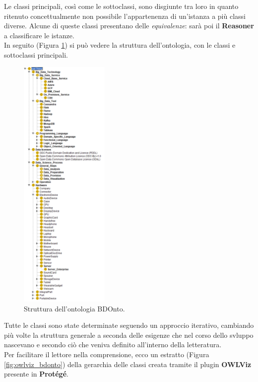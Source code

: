 Le classi principali, così come le sottoclassi, sono disgiunte tra loro in quanto ritenuto concettualmente non possibile l'appartenenza di un'istanza a più classi diverse. Alcune di queste classi presentano delle \textit{equivalenze}: sarà poi il \textbf{Reasoner} a classificare le istanze.\\

In seguito (Figura \ref*{fig:classi_bdonto}) si può vedere la struttura dell'ontologia, con le classi e sottoclassi principali.

\begin{figure}[H]
    \centering
    \includegraphics[height=12.5cm]{docs/images/taxonomyWS.PNG}
    \caption{Struttura dell'ontologia BDOnto.}
    \label{fig:classi_bdonto}
\end{figure}
Tutte le classi sono state determinate seguendo un approccio iterativo, cambiando più volte la struttura generale a seconda delle esigenze che nel corso dello svluppo nascevano e secondo ciò che veniva definito all'interno della letteratura.\\

Per facilitare il lettore nella comprensione, ecco un estratto (Figura \ref{fig:owlviz_bdonto}) della gerarchia delle classi creata tramite il plugin \textbf{OWLViz} presente in \textbf{Protégé}.

